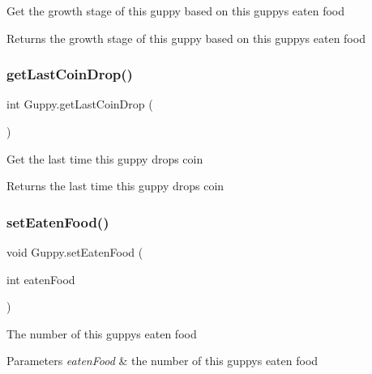 Get the growth stage of this guppy based on this guppy\textquotesingle{}s eaten food \begin{DoxyReturn}{Returns}
the growth stage of this guppy based on this guppy\textquotesingle{}s eaten food 
\end{DoxyReturn}
\mbox{\label{class_guppy_a37a9561b9fdc8dd53031d322b7e73872}} 
\subsubsection{\texorpdfstring{get\+Last\+Coin\+Drop()}{getLastCoinDrop()}}
{\footnotesize\ttfamily int Guppy.\+get\+Last\+Coin\+Drop (\begin{DoxyParamCaption}{ }\end{DoxyParamCaption})\hspace{0.3cm}{\ttfamily [inline]}}

Get the last time this guppy drops coin \begin{DoxyReturn}{Returns}
the last time this guppy drops coin 
\end{DoxyReturn}
\mbox{\label{class_guppy_a7d7e13e9ae11547a1c41f7c67d228a5b}} 
\subsubsection{\texorpdfstring{set\+Eaten\+Food()}{setEatenFood()}}
{\footnotesize\ttfamily void Guppy.\+set\+Eaten\+Food (\begin{DoxyParamCaption}\item[{int}]{eaten\+Food }\end{DoxyParamCaption})\hspace{0.3cm}{\ttfamily [inline]}}

The number of this guppy\textquotesingle{}s eaten food 
\begin{DoxyParams}{Parameters}
{\em eaten\+Food} & the number of this guppy\textquotesingle{}s eaten food \\
\hline
\end{DoxyParams}
\mbox{\label{class_guppy_ad5eb8182fde38ea341af788041f21918}} 

